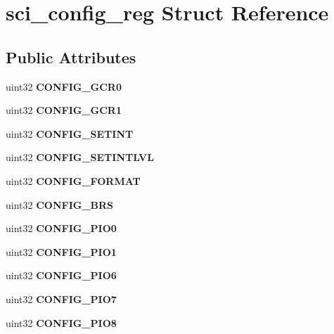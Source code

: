 \hypertarget{structsci__config__reg}{}\section{sci\+\_\+config\+\_\+reg Struct Reference}
\label{structsci__config__reg}
\subsection*{Public Attributes}
\begin{DoxyCompactItemize}
\item 
\mbox{\label{structsci__config__reg_a3e8ff104b6c4d27ff55e81c9f1a32e61}} 
uint32 {\bfseries C\+O\+N\+F\+I\+G\+\_\+\+G\+C\+R0}
\item 
\mbox{\label{structsci__config__reg_a51151a6c25ef3783c6d3f36b605cb545}} 
uint32 {\bfseries C\+O\+N\+F\+I\+G\+\_\+\+G\+C\+R1}
\item 
\mbox{\label{structsci__config__reg_a5d864588492c494e109d34beee9a6de8}} 
uint32 {\bfseries C\+O\+N\+F\+I\+G\+\_\+\+S\+E\+T\+I\+NT}
\item 
\mbox{\label{structsci__config__reg_a2644fb17a9b3668882c57f338b128b2a}} 
uint32 {\bfseries C\+O\+N\+F\+I\+G\+\_\+\+S\+E\+T\+I\+N\+T\+L\+VL}
\item 
\mbox{\label{structsci__config__reg_a1550af3fda356ec268a6842b74bcda51}} 
uint32 {\bfseries C\+O\+N\+F\+I\+G\+\_\+\+F\+O\+R\+M\+AT}
\item 
\mbox{\label{structsci__config__reg_a6ad80b76ba729fc1a62a1db99a9a5fe6}} 
uint32 {\bfseries C\+O\+N\+F\+I\+G\+\_\+\+B\+RS}
\item 
\mbox{\label{structsci__config__reg_a8130363d121ce5de8a977bb12694237b}} 
uint32 {\bfseries C\+O\+N\+F\+I\+G\+\_\+\+P\+I\+O0}
\item 
\mbox{\label{structsci__config__reg_a69a0ee694f138c7c900c11dfe52cdb6e}} 
uint32 {\bfseries C\+O\+N\+F\+I\+G\+\_\+\+P\+I\+O1}
\item 
\mbox{\label{structsci__config__reg_a722f8667a2f06b74d33b1e47ad9de74a}} 
uint32 {\bfseries C\+O\+N\+F\+I\+G\+\_\+\+P\+I\+O6}
\item 
\mbox{\label{structsci__config__reg_a406577e9a53aa34b43432bf6382a589e}} 
uint32 {\bfseries C\+O\+N\+F\+I\+G\+\_\+\+P\+I\+O7}
\item 
\mbox{\label{structsci__config__reg_a433feb9e010667c9b560283f0b0f7be2}} 
uint32 {\bfseries C\+O\+N\+F\+I\+G\+\_\+\+P\+I\+O8}
\end{DoxyCompactItemize}


